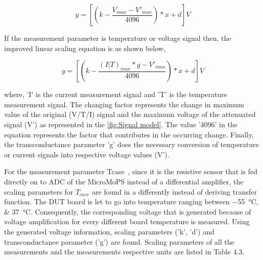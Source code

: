 

\[ y =  
 \left[\left(k - \frac{V_{max}-V'_{max}} {4096}\right)*x + d \right] V
\] 

If the measurement parameter is temperature or voltage signal then, the improved linear scaling equation is as shown below,


\[ y = 
 \left[\left(k - \frac{(I|T)_{max}*g-V'_{max}} {4096}\right)*x + d \right] V
\] 

where, 'I' is the current measurement signal and 'T' is the temperature measurement signal.
	The changing factor represents the change in maximum value of the original (V/T/I) signal and the maximum voltage of the attenuated signal (V') as represented in the \cref{fig:Signal model}. 
	The value '4096' in the equation represents the factor that contributes in the occurring change. 
	Finally, the transconductance parameter 'g' does the necessary conversion of temperature or current signals into respective voltage values (V').

For the measurement parameter \gls{Tcase}~\cite{Sleik2018a}, since it is the resistive sensor that is fed directly on to ADC of the MicroMoPS instead of a differential amplifier, the scaling parameters for $T_{case}$ are found in a differently instead of deriving transfer function.
The DUT board is let to go into temperature ranging between \SIlist{-55;37}{\celsius}.
Consequently, the corresponding voltage that is generated because of voltage amplification for every different board temperature is measured. 
Using the generated voltage information, scaling parameters ('k', 'd') and transconductance parameter ('g') are found. 
Scaling parameters of all the measurements and the measurements respective units are listed in Table 4.3.

